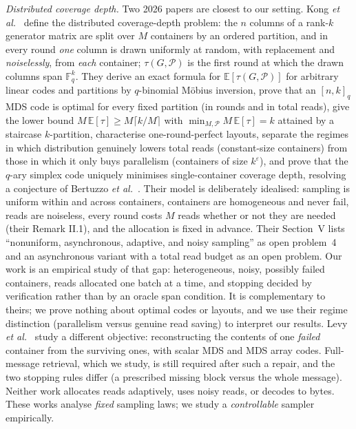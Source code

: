 \documentclass[acmsmall,screen]{acmart}
\newcommand{\E}{\mathbb{E}}
\begin{document}
\emph{Distributed coverage depth.}  Two 2026 papers are closest to our setting.  Kong \emph{et al.}~\cite{kong2026coverage} define the distributed coverage-depth
problem: the $n$ columns of a rank-$k$ generator matrix are split over $M$ containers by an ordered
partition, and in every round \emph{one} column is drawn uniformly at random, with replacement and
\emph{noiselessly}, from \emph{each} container; $\tau(G,\mathcal P)$ is the first round at which the
drawn columns span $\mathbb F_q^k$.  They derive an exact formula for $\E[\tau(G,\mathcal P)]$ for
arbitrary linear codes and partitions by $q$-binomial M\"obius inversion, prove that an $[n,k]_q$ MDS
code is optimal for every fixed partition (in rounds and in total reads), give the lower bound
$M\,\E[\tau]\ge M\lceil k/M\rceil$ with $\min_{M,\mathcal P}M\,\E[\tau]=k$ attained by a staircase
$k$-partition, characterise one-round-perfect layouts, separate the regimes in which distribution
genuinely lowers total reads (constant-size containers) from those in which it only buys parallelism
(containers of size $k^\varepsilon$), and prove that the $q$-ary simplex code uniquely minimises
single-container coverage depth, resolving a conjecture of Bertuzzo \emph{et al.}~\cite{bertuzzo2025coverage}.
Their model is deliberately idealised: sampling is uniform within and across containers, containers are
homogeneous and never fail, reads are noiseless, every round costs $M$ reads whether or not they are
needed (their Remark II.1), and the allocation is fixed in advance.  Their Section~V lists
``nonuniform, asynchronous, adaptive, and noisy sampling'' as open problem~4 and an asynchronous
variant with a total read budget as an open problem.  Our work is an empirical study of that gap:
heterogeneous, noisy, possibly failed containers, reads allocated one batch at a time, and stopping
decided by verification rather than by an oracle span condition.  It is complementary to theirs; we
prove nothing about optimal codes or layouts, and we use their regime distinction (parallelism versus
genuine read saving) to interpret our results.  Levy
\emph{et al.}~\cite{levy2026expected} study a different objective: reconstructing the contents of one
\emph{failed} container from the surviving ones, with scalar MDS and MDS array codes.  Full-message
retrieval, which we study, is still required after such a repair, and the two stopping rules differ
(a prescribed missing block versus the whole message).  Neither work allocates reads adaptively, uses
noisy reads, or decodes to bytes.  These works analyse \emph{fixed} sampling laws; we study a
\emph{controllable} sampler empirically.
\end{document}
